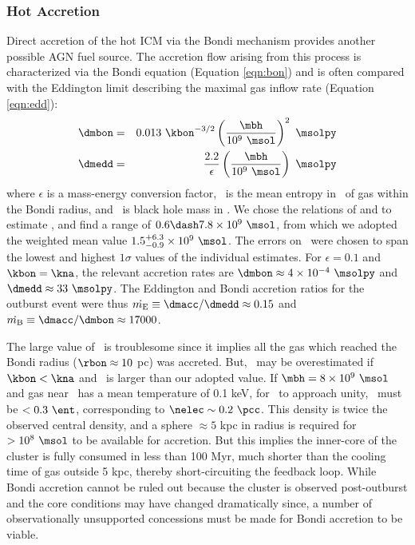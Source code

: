 \documentclass[11pt, preprint]{aastex}
\begin{document}
\subsubsection{Hot Accretion}

Direct accretion of the hot ICM via the Bondi mechanism provides
another possible AGN fuel source. The accretion flow arising from this
process is characterized via the Bondi equation (Equation
\ref{eqn:bon}) and is often compared with the Eddington limit
describing the maximal gas inflow rate (Equation \ref{eqn:edd}):
\begin{eqnarray}
  \dmbon &=& 0.013 ~\kbon^{-3/2} \left(\frac{\mbh}{10^9
    ~\msol}\right)^{2} ~\msolpy \label{eqn:bon}\\
  \dmedd &=& \frac{2.2}{\epsilon} \left(\frac{\mbh}{10^9~\msol}\right)
  ~\msolpy  \label{eqn:edd}
\end{eqnarray}
where $\epsilon$ is a mass-energy conversion factor, \kbon\ is the
mean entropy in \ent\ of gas within the Bondi radius, and \mbh\ is
black hole mass in \msol. We chose the relations of
\citet{2002ApJ...574..740T} and \citet{2007MNRAS.379..711G} to
estimate \mbh, and find a range of $0.6 \dash 7.8 \times 10^9 ~\msol$,
from which we adopted the weighted mean value $1.5^{+6.3}_{-0.9}
\times 10^9 ~\msol$. The errors on \mbh\ were chosen to span the
lowest and highest $1\sigma$ values of the individual estimates. For
$\epsilon = 0.1$ and $\kbon = \kna$, the relevant accretion rates are
$\dmbon \approx 4 \times 10^{-4} ~\msolpy$ and $\dmedd \approx 33
~\msolpy$. The Eddington and Bondi accretion ratios for the outburst
event were thus $\dme \equiv \dmacc/\dmedd \approx 0.15$ and $\dmb
\equiv \dmacc/\dmbon \approx 17000$.

The large value of \dmb\ is troublesome since it implies all the gas
which reached the Bondi radius ($\rbon \approx 10$ pc) was
accreted. But, \dmb\ may be overestimated if $\kbon < \kna$ and
\mbh\ is larger than our adopted value. If $\mbh = 8 \times 10^9
~\msol$ and gas near \rbon\ has a mean temperature of 0.1 keV, for
\dmb\ to approach unity, \kbon\ must be $< 0.3 ~\ent$, corresponding
to $\nelec \sim 0.2 ~\pcc$. This density is twice the observed central
density, and a sphere $\approx 5$ kpc in radius is required for $>
10^8 ~\msol$ to be available for accretion. But this implies the
inner-core of the cluster is fully consumed in less than 100 Myr, much
shorter than the cooling time of gas outside 5 kpc, thereby
short-circuiting the feedback loop. While Bondi accretion cannot be
ruled out because the cluster is observed post-outburst and the core
conditions may have changed dramatically since, a number of
observationally unsupported concessions must be made for Bondi
accretion to be viable.
\end{document}
